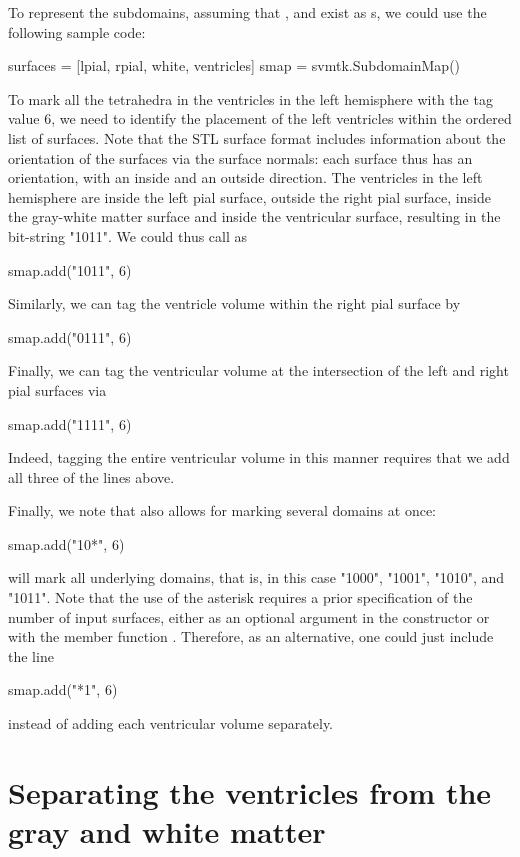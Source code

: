 To represent the subdomains, assuming that , and  exist as
s, we could use the following sample code:
\begin{python} 
surfaces = [lpial, rpial, white, ventricles]
smap = svmtk.SubdomainMap()
\end{python}
To mark all the tetrahedra in the ventricles in the left hemisphere
with the tag value 6, we need to identify the placement of the left
ventricles within the ordered list of surfaces. Note that the STL
surface format includes information about the orientation of the
surfaces via the surface normals: each surface thus has an orientation,
with an inside and an outside direction. The ventricles in the left
hemisphere are inside the left pial surface, outside the right pial
surface, inside the gray-white matter surface and inside the
ventricular surface, resulting in the bit-string "1011". We could thus
call  as 
\begin{python}
smap.add("1011", 6)
\end{python}
Similarly, we can tag the ventricle volume within the right pial
surface by
\begin{python}
smap.add("0111", 6)
\end{python}
Finally, we can tag the ventricular volume at the intersection of the
left and right pial surfaces via
\begin{python}
smap.add("1111", 6)
\end{python}
Indeed, tagging the entire ventricular volume in this manner requires that we add all
three of the lines above.

Finally, we note that {\svmtk} also allows for marking several
domains at once:
\begin{python}
smap.add("10*", 6)
\end{python}
will mark all underlying domains, that is, in this case "1000", "1001",
"1010", and "1011".  Note that the use of the asterisk requires a
prior specification of the number of input surfaces, either as an
optional argument in the constructor or with the member function
. Therefore, as an alternative, one
could just include the line
\begin{python}
smap.add("*1", 6)
\end{python}
instead of adding each ventricular volume separately.

\section{Separating the ventricles from the gray and white matter}
\label{sec:chp4:tools:remove-vent}

